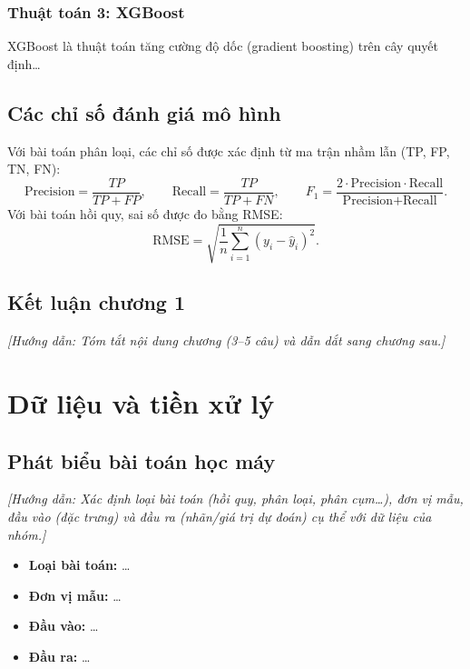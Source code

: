 \documentclass[12pt,a4paper,oneside]{report}
\newcommand{\huongdan}[1]{{\color{guide}\itshape [Hướng dẫn: #1]}}
\begin{document}
\subsection{Thuật toán 3: XGBoost}
XGBoost \cite{chen2016} là thuật toán tăng cường độ dốc (gradient boosting)
trên cây quyết định\dots

\section{Các chỉ số đánh giá mô hình}
Với bài toán phân loại, các chỉ số được xác định từ ma trận nhầm lẫn
(TP, FP, TN, FN):
\begin{equation}
  \text{Precision} = \frac{TP}{TP+FP},\qquad
  \text{Recall} = \frac{TP}{TP+FN},\qquad
  F_1 = \frac{2\cdot\text{Precision}\cdot\text{Recall}}{\text{Precision}+\text{Recall}}.
  \label{eq:f1}
\end{equation}
Với bài toán hồi quy, sai số được đo bằng RMSE:
\begin{equation}
  \text{RMSE} = \sqrt{\frac{1}{n}\sum_{i=1}^{n}\left(y_i-\hat{y}_i\right)^2}.
  \label{eq:rmse}
\end{equation}

\section{Kết luận chương 1}
\huongdan{Tóm tắt nội dung chương (3--5 câu) và dẫn dắt sang chương sau.}

\chapter{Dữ liệu và tiền xử lý}
\label{chap:dulieu}

\section{Phát biểu bài toán học máy}
\huongdan{Xác định loại bài toán (hồi quy, phân loại, phân cụm\dots), đơn vị
mẫu, đầu vào (đặc trưng) và đầu ra (nhãn/giá trị dự đoán) cụ thể với dữ liệu
của nhóm.}

\begin{itemize}
  \item \textbf{Loại bài toán:} \dots
  \item \textbf{Đơn vị mẫu:} \dots
  \item \textbf{Đầu vào:} \dots
  \item \textbf{Đầu ra:} \dots
\end{itemize}
\end{document}

